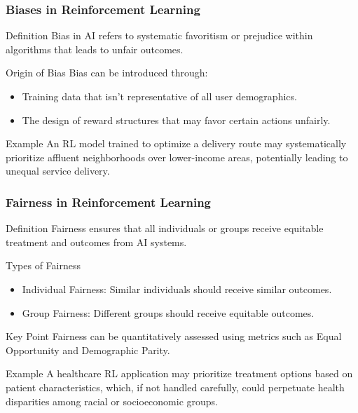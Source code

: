\documentclass{beamer}
\begin{document}
\begin{frame}[fragile]
    \frametitle{Biases in Reinforcement Learning}
    \begin{block}{Definition}
        Bias in AI refers to systematic favoritism or prejudice within algorithms that leads to unfair outcomes.
    \end{block}
    \begin{block}{Origin of Bias}
        Bias can be introduced through:
        \begin{itemize}
            \item Training data that isn't representative of all user demographics.
            \item The design of reward structures that may favor certain actions unfairly.
        \end{itemize}
    \end{block}
    \begin{block}{Example}
        An RL model trained to optimize a delivery route may systematically prioritize affluent neighborhoods over lower-income areas, potentially leading to unequal service delivery.
    \end{block}
\end{frame}

\begin{frame}[fragile]
    \frametitle{Fairness in Reinforcement Learning}
    \begin{block}{Definition}
        Fairness ensures that all individuals or groups receive equitable treatment and outcomes from AI systems.
    \end{block}
    \begin{block}{Types of Fairness}
        \begin{itemize}
            \item Individual Fairness: Similar individuals should receive similar outcomes.
            \item Group Fairness: Different groups should receive equitable outcomes.
        \end{itemize}
    \end{block}
    \begin{block}{Key Point}
        Fairness can be quantitatively assessed using metrics such as Equal Opportunity and Demographic Parity.
    \end{block}
    \begin{block}{Example}
        A healthcare RL application may prioritize treatment options based on patient characteristics, which, if not handled carefully, could perpetuate health disparities among racial or socioeconomic groups.
    \end{block}
\end{frame}
\end{document}
